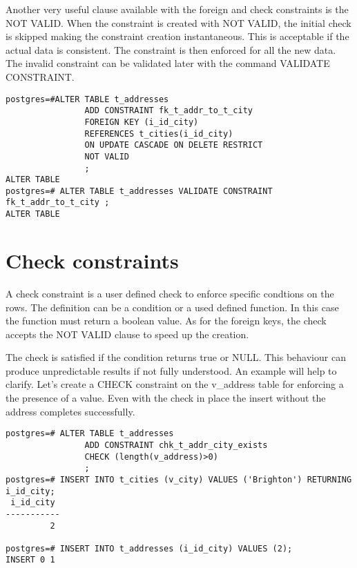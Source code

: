 Another very useful clause available with the foreign and check constraints is the NOT VALID. When 
the constraint is created with NOT VALID, the initial check is skipped making the constraint 
creation instantaneous. This is acceptable if the actual data is consistent. The constraint is then 
enforced for all the new data. The invalid constraint can be validated later with the command 
VALIDATE CONSTRAINT.

\begin{lstlisting}[style=pgsql]
postgres=#ALTER TABLE t_addresses
                ADD CONSTRAINT fk_t_addr_to_t_city
                FOREIGN KEY (i_id_city)
                REFERENCES t_cities(i_id_city)
                ON UPDATE CASCADE ON DELETE RESTRICT
                NOT VALID
                ;
ALTER TABLE
postgres=# ALTER TABLE t_addresses VALIDATE CONSTRAINT fk_t_addr_to_t_city ;
ALTER TABLE

\end{lstlisting}



\section{Check constraints}
\label{sec:CHECKCNS}

A check constraint is a user defined check to enforce specific condtions on the rows. 
The definition can be a condition or a used defined function. In this case the function must return 
a boolean value.  As for the foreign keys, the check accepts the NOT VALID clause to speed up the 
creation.\newline

The check is satisfied if the condition returns true or NULL. This behaviour can 
produce unpredictable results if not fully understood. An example will help to clarify. 
Let's create a CHECK constraint on the v\_address table for enforcing a the presence of a value.
Even with the check in place the insert without the address completes successfully.

\begin{lstlisting}[style=pgsql]
postgres=# ALTER TABLE t_addresses
                ADD CONSTRAINT chk_t_addr_city_exists
                CHECK (length(v_address)>0)
                ; 
postgres=# INSERT INTO t_cities (v_city) VALUES ('Brighton') RETURNING i_id_city;
 i_id_city 
-----------
         2

postgres=# INSERT INTO t_addresses (i_id_city) VALUES (2);
INSERT 0 1
\end{lstlisting}


